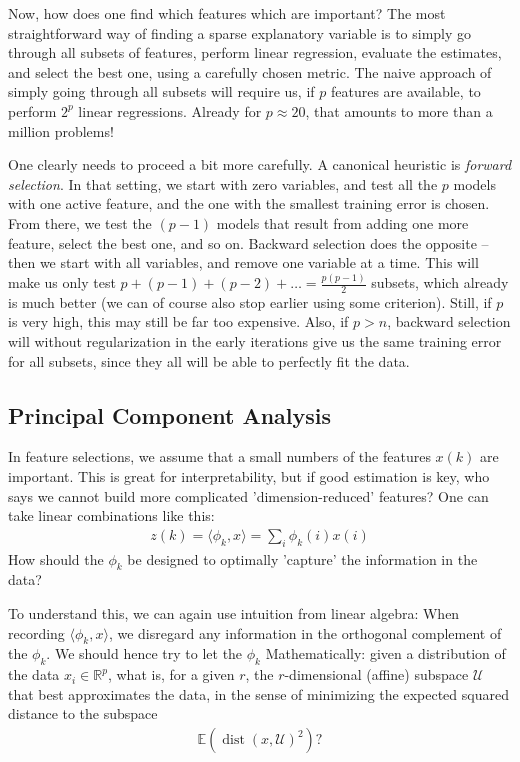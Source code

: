 \documentclass{article}
\newcommand{\sprod}[1]{\langle #1 \rangle}
\newcommand{\calU}{\mathcal{U}}
\newcommand{\R}{\mathbb{R}}
\DeclareMathOperator{\dist}{dist}
\begin{document}
Now, how does one find which features which are important? The most straightforward way of finding a sparse explanatory variable is to simply go through all subsets of features, perform linear regression, evaluate the estimates, and select the best one, using a carefully chosen metric. The naive approach of simply going through all subsets will require us, if $p$ features are available, to perform $2^p$ linear regressions. Already for $p\approx 20$, that amounts to more than a million problems! 


One clearly needs to proceed a bit more carefully. A canonical heuristic is \emph{forward selection}. In that setting, we start with zero variables, and test all the $p$ models with one active feature, and the one with the smallest training error is chosen. From there, we test the $(p-1)$ models that result from adding one more feature, select the best one, and so on. Backward selection does the opposite -- then we start with all variables, and remove one variable at a time. This will make us only test $p + (p-1)+(p-2) + \dots = \frac{p(p-1)}{2}$ subsets, which already is much better (we can of course also stop earlier using some criterion). Still, if $p$ is very high, this may still be far too expensive. Also, if $p>n$, backward selection will without regularization in the early iterations give us the same training error for all subsets, since they all will be able to perfectly fit the data.





\subsection{Principal Component Analysis}
In feature selections, we assume that a small numbers of the features $x(k)$ are important. This is great for interpretability, but if good estimation is key, who says we cannot build more complicated 'dimension-reduced' features? One can take linear combinations like this:
\begin{align*}
    z(k) = \sprod{\phi_k , x} = \sum_i \phi_k(i)x(i)
\end{align*}
How should the $\phi_k$ be designed to optimally 'capture' the information in the data? 

To understand this, we can again use intuition from linear algebra: When recording $\sprod{\phi_k,x}$, we disregard any information in the orthogonal complement of the $\phi_k$. We should hence try to let the $\phi_k$  Mathematically: given a distribution of the data $x_i \in \R^p$, what is, for a given $r$, the $r$-dimensional (affine) subspace $\calU$ that best approximates the data, in the sense of minimizing the expected squared distance to the subspace
\begin{align*}
    \mathbb{E}(\dist(x,\calU)^2)?
\end{align*}
\end{document}
